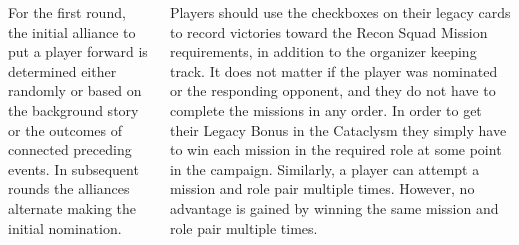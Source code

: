 \begin{columns}
For the first round, the initial alliance to put a player forward is
determined either randomly or based on the background story or the
outcomes of connected preceding events.  In subsequent rounds the
alliances alternate making the initial nomination.

Players should use the checkboxes on their legacy cards to record
victories toward the Recon Squad Mission requirements, in addition to
the organizer keeping track.  It does not matter if the player was
nominated or the responding opponent, and they do not have to complete
the missions in any order.  In order to get their Legacy Bonus in the
Cataclysm they simply have to win each mission in the required role at
some point in the campaign.  Similarly, a player can attempt a mission
and role pair multiple times.  However, no advantage is gained by
winning the same mission and role pair multiple times.

\end{columns}

